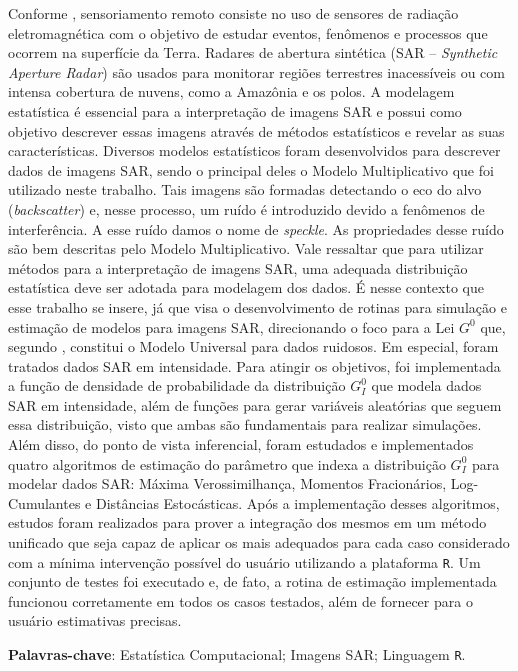 \documentclass[tcc]{ic}
\begin{document}
\begin{agradecimentos}
\begin{resumo}
Conforme \citet{SensoriamentoRemotoBook}, sensoriamento remoto consiste no uso de sensores de radiação eletromagnética com o objetivo de estudar eventos, fenômenos e processos que ocorrem na superfície da Terra.
Radares de abertura sintética (SAR -- \textit{Synthetic Aperture Radar}) são usados para monitorar regiões terrestres inacessíveis ou com intensa cobertura de nuvens, como a Amazônia e os polos.
%
A modelagem estatística é essencial para a interpretação de imagens SAR e possui como objetivo descrever essas imagens através de métodos estatísticos e revelar as suas características.
Diversos modelos estatísticos foram desenvolvidos para descrever dados de imagens SAR, sendo o principal deles o Modelo Multiplicativo que foi utilizado neste trabalho.
Tais imagens são formadas detectando o eco do alvo (\textit{backscatter}) e, nesse processo, um ruído é introduzido devido a fenômenos de interferência. 
A esse ruído damos o nome de \textit{speckle}. 
As propriedades desse ruído são bem descritas pelo Modelo Multiplicativo.
%
Vale ressaltar que para utilizar métodos para a interpretação de imagens SAR, uma adequada distribuição estatística deve ser adotada para modelagem dos dados. 
É nesse contexto que esse trabalho se insere, já que visa o desenvolvimento de rotinas para simulação e estimação de modelos para imagens SAR, direcionando o foco para a Lei $G^{0}$ que, segundo \citet{FreryMinute2004}, constitui o Modelo Universal para dados ruidosos. Em especial, foram tratados dados SAR em intensidade. 
%
Para atingir os objetivos, foi implementada a função de densidade de probabilidade da distribuição $G_I^0$ que modela dados SAR em intensidade, além de funções para gerar variáveis aleatórias que seguem essa distribuição, visto que ambas são fundamentais para realizar simulações. 
Além disso, do ponto de vista inferencial, foram estudados e implementados quatro algoritmos de estimação do parâmetro que indexa a distribuição $G_I^{0}$ para modelar dados SAR: Máxima Verossimilhança, Momentos Fracionários, Log-Cumulantes e Distâncias Estocásticas.
%
Após a implementação desses algoritmos, estudos foram realizados para prover a integração dos mesmos em um método unificado que seja capaz de aplicar os mais adequados para cada caso considerado com a mínima intervenção possível do usuário utilizando a plataforma \texttt{R}. 
Um conjunto de testes foi executado e, de fato, a rotina de estimação implementada funcionou corretamente em todos os casos testados, além de fornecer para o usuário estimativas precisas.

\vspace{2em}
\textbf{Palavras-chave}: Estatística Computacional; Imagens SAR; Linguagem \texttt R.


\end{resumo}
\end{agradecimentos}
\end{document}

